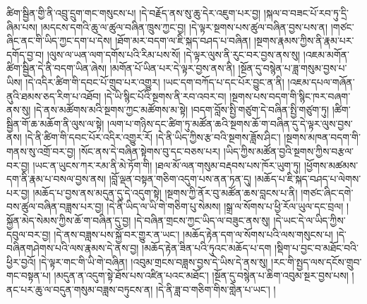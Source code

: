 ཚིག་སྦྱིན་གྱི་ནི་འབྲུ་དྲུག་གང་གསུངས་པ། །དེ་བརྗོད་ནས་སུ་ཆུ་དེར་འཇུག་པར་བྱ། །སྐལ་བ་བཟང་པོ་རབ་ཏུ་དྲི་ཞིམ་པས། །མདངས་དགའི་ཆུ་ལ་ཚུལ་བཞིན་ཁྲུས་ཀྱང་བྱ། །དེ་ལྟར་སྔགས་པས་ཚུལ་བཞིན་བྱས་པས་ན། །གཙང་ཞིང་ནང་གི་ཡིད་ཀྱང་དག་པ་དེས། །ཐོག་མར་བདག་ལ་ཇི་སྐད་བཤད་པ་བཞིན། །སྔགས་རྣམས་ཀྱིས་ནི་རྣམ་པར་དགོད་བྱ་བ། །ལུས་ལ་ཡན་ལག་དགོས་པའི་རིམ་པས་སོ། །དེ་ལྟར་ལུས་ནི་རུང་བར་བྱས་ནས་སུ། །འཇམ་མགོན་ཚིག་སྦྱིན་དེ་ནི་བདག་ཡིན་ཞེས། །མགོན་པོ་ཡིན་པར་དེ་ལྟར་བྱས་ནས་ནི། །སྔོན་དུ་བསྙེན་པ་ཟླ་གསུམ་བྱས་པ་ཡིས། །དེ་འདིར་ཚིག་གི་དབང་པོ་གྲུབ་པར་འགྱུར། །ཡང་དག་བཀོད་པ་དང་པོར་བྱུང་ན་ནི། །འཇམ་དཔལ་གཞོན་ནུའི་ཐམས་ཅད་རིག་པ་འཐོབ། །དེ་ཡི་སྙིང་པོའི་སྔགས་ནི་རབ་འབར་བ། །སྔགས་པས་བདག་གི་སྙིང་ཁར་བཞག་ནས་སུ། །དེ་ནས་མཚོགས་མའི་སྔགས་ཀྱང་མཚོགས་མ་སྟེ། །བདག་བློས་སྤྱི་གཙུག་དེ་བཞིན་སྤྱི་གཙུག་ཏུ། །ཚིག་སྦྱིན་གོ་ཆ་མཆོག་ནི་ལུས་ལ་སྟེ། །ལག་པ་གཉིས་དང་ཚིག་ཏུ་མཚོན་ཆའི་སྔགས་ཆོ་ག་བཞིན་དུ་དེ་ལྟར་ལུས་བྱས་ནས། །དེ་ནི་ཚིག་གི་དབང་པོར་འདིར་འགྱུར་རོ། །དེ་ནི་ཡིད་ཀྱིས་རྩ་བའི་སྔགས་ཟློས་ཤིང་། །སྔགས་མཁན་བདག་གི་གནས་སུ་འགྲོ་བར་བྱ། །སོང་ནས་དེ་བཞིན་སྟེགས་བུ་དང་བཅས་པར། །ཡིད་ཀྱིས་མཚོན་བྱའི་སྔགས་ཀྱིས་བརྩལ་བར་བྱ། །ཡང་ན་ཡུངས་ཀར་རམ་ནི་མེ་ཏོག་གི། །ཐལ་མོ་ལན་གསུམ་བརྡབས་པས་ཁོར་ཡུག་ཏུ། །ཕྱོགས་མཚམས་དག་ནི་རྣམ་པ་བསལ་བྱས་ནས། །བློ་ལྡན་བསྟན་གཅིག་འདུག་པས་ནན་ཏན་དུ། །མཆོད་པ་ཇི་སྐད་བཤད་པ་ལེགས་པར་བྱ། །མཆོད་པ་བྱས་ནས་མདུན་དུ་དེ་འདུག་སྟེ། །སྔགས་ཀྱི་ནོར་བུ་མཚོན་ཆས་བླངས་པ་ནི། །གཙང་ཞིང་དགེ་བས་ཚུལ་བཞིན་བཟླས་པར་བྱ། །དེ་ནི་ཡིད་ལ་ཡི་གེ་གཅིག་པུ་སེམས། །སྒྲ་ལ་སོགས་པ་ཕྱི་རོལ་ཡུལ་དང་བྲལ། །སྐྱོན་མེད་སེམས་ཀྱིས་ཆོ་ག་བཞིན་དུ་བྱ། །དེ་བཞིན་གྲངས་ཀྱང་ཡིད་ལ་བཟུང་ནས་སུ། །དེ་ཡང་དེ་ལ་ཡིད་ཀྱིས་དབུལ་བར་བྱ། །དེ་ནས་བཟླས་པས་སྐྱོ་བར་གྱུར་ན་ཡང་། །མཆོད་རྟེན་དག་ལ་སོགས་པའི་ལས་གསུངས་པ། །དེ་བཞིནགཤེགས་པའི་ལས་རྣམས་དེ་ནས་བྱ། །མཆོད་རྟེན་ཟིན་པའི་ཏུའང་མཆོད་པ་དག །སྡིག་པ་བྱང་བ་མཐོང་བའི་ཕྱིར་བྱའོ། །དེ་ལྟར་གང་གི་ཡི་གེ་བཞིན། །འབུམ་གྲངས་བཟླས་བྱས་དེ་ཡིས་དེ་ནས་སུ། །རང་གི་སྤྱད་ལས་དངོས་གྲུབ་གང་བསྟན་པ། །མདུན་ན་འདུག་སྟེ་ཐོས་པས་འཛིན་པའང་མཐོང་། །སྔོན་དུ་བསྙེན་པ་ཆིག་འབུམ་སྔར་བྱས་པས། །ནང་པར་ཆུ་ལ་བདུན་གསུམ་བཟླས་བཏུངས་ན། །དེ་ནི་ཟླ་བ་གཅིག་གིས་གླེན་པ་ཡང་། །
